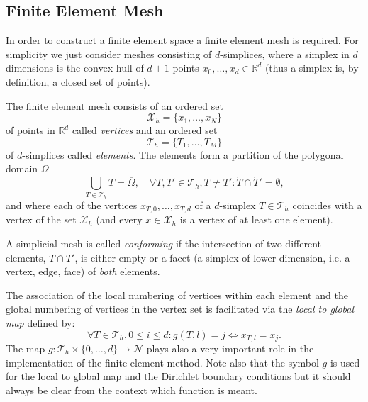 \documentclass[a4paper,12pt]{article}
\begin{document}
\subsection{Finite Element Mesh}

In order to construct a finite element space a finite element mesh is required.
For simplicity we just consider meshes consisting of $d$-simplices, where a simplex
in $d$ dimensions is the convex hull of $d+1$ points $x_{0},\ldots,x_{d}\in\mathbb{R}^d$
(thus a simplex is, by definition, a closed set of points).

The finite element mesh consists of an ordered set
\begin{equation}
\mathcal{X}_h = \{x_1,\ldots,x_N\}
\end{equation}
of points in $\mathbb{R}^d$ called {\em vertices} and an ordered set 
\begin{equation}
\mathcal{T}_h = \{T_1, \ldots, T_M\}
\end{equation}
of $d$-simplices called {\em elements}.
The elements form a partition of the polygonal domain $\Omega$
\begin{equation}
\bigcup_{T\in \mathcal{T}_h} T = \overline{\Omega}, \quad 
\forall T, T' \in \mathcal{T}_h, T\neq T' : \mathring{T} \cap \mathring{T}' = \emptyset,
\end{equation}
and where each of the vertices $x_{T,0},\ldots,x_{T,d}$  of a $d$-simplex $T\in\mathcal{T}_h$
coincides with a vertex of the set $\mathcal{X}_h$ (and every $x\in\mathcal{X}_h$ is a vertex
of at least one element).

A simplicial mesh is called {\em conforming} if
the intersection of two different elements, $T\cap T'$, is either
empty or a facet (a simplex of lower dimension, i.e. a vertex, edge, face) of {\em both} elements.

The association of the local numbering of vertices within each element 
and the global numbering of vertices in the vertex set is facilitated
via the {\em local to global map} defined by:
\begin{equation}
\forall T\in\mathcal{T}_h, 0\leq i \leq d: g(T,l) = j \Leftrightarrow x_{T,l} = x_{j} .
\end{equation}
The map $g:\mathcal{T}_h\times\{0,\ldots,d\}\to\mathcal{N}$ 
plays also a very important role in the implementation of the finite element method.
Note also that the symbol $g$ is used for the local to global map and the Dirichlet
boundary conditions but it should always be clear from the context which function is meant.
\end{document}
